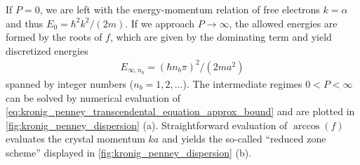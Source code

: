 If $P=0$, we are left with the energy-momentum relation of free electrons $k=\alpha$ and thus $E_0={\hbar^2k^2}/({2m})$.
If we approach $P\rightarrow\infty$, the allowed energies are formed by the roots of $f$, which are given by the dominating term and yield discretized energies
\begin{align}
    E_{\infty,n_b}=(\hbar n_b\pi)^2/(2ma^2)
    \label{eq:kronig_penney_energy_tb}
\end{align}
spanned by integer numbers ($n_b=1,2,\dots$).
The intermediate regimes $0<P<\infty$ can be solved by numerical evaluation of \cref{eq:kronig_penney_transcendental_equation_approx_bound} and are plotted in \cref{fig:kronig_penney_dispersion} (a).
Straightforward evaluation of $\arccos(f)$ evaluates the crystal momentum $ka$ and yields the so-called ``reduced zone scheme'' displayed in \cref{fig:kronig_penney_dispersion} (b).
\\

